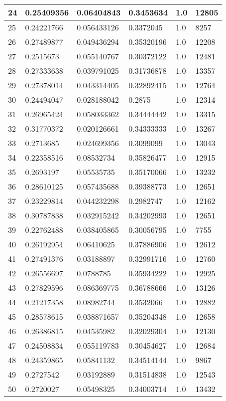 \begin{longtable}{|l|l|l|l|l|l|}
24 & 0.25409356 & 0.06404843 & 0.3453634 & 1.0 & 12805 \\ \hline 
25 & 0.24221766 & 0.056433126 & 0.3372045 & 1.0 & 8257 \\ \hline 
26 & 0.27489877 & 0.049436294 & 0.35320196 & 1.0 & 12208 \\ \hline 
27 & 0.2515673 & 0.055140767 & 0.30372122 & 1.0 & 12481 \\ \hline 
28 & 0.27333638 & 0.039791025 & 0.31736878 & 1.0 & 13357 \\ \hline 
29 & 0.27378014 & 0.043314405 & 0.32892415 & 1.0 & 12764 \\ \hline 
30 & 0.24494047 & 0.028188042 & 0.2875 & 1.0 & 12314 \\ \hline 
31 & 0.26965424 & 0.058033362 & 0.34444442 & 1.0 & 13315 \\ \hline 
32 & 0.31770372 & 0.020126661 & 0.34333333 & 1.0 & 13267 \\ \hline 
33 & 0.2713685 & 0.024699356 & 0.3099099 & 1.0 & 13043 \\ \hline 
34 & 0.22358516 & 0.08532734 & 0.35826477 & 1.0 & 12915 \\ \hline 
35 & 0.2693197 & 0.05535735 & 0.35170066 & 1.0 & 13232 \\ \hline 
36 & 0.28610125 & 0.057435688 & 0.39388773 & 1.0 & 12651 \\ \hline 
37 & 0.23229814 & 0.044232298 & 0.2982747 & 1.0 & 12162 \\ \hline 
38 & 0.30787838 & 0.032915242 & 0.34202993 & 1.0 & 12651 \\ \hline 
39 & 0.22762488 & 0.038405865 & 0.30056795 & 1.0 & 7755 \\ \hline 
40 & 0.26192954 & 0.06410625 & 0.37886906 & 1.0 & 12612 \\ \hline 
41 & 0.27491376 & 0.03188897 & 0.32991716 & 1.0 & 12760 \\ \hline 
42 & 0.26556697 & 0.0788785 & 0.35934222 & 1.0 & 12925 \\ \hline 
43 & 0.27829596 & 0.086369775 & 0.36788666 & 1.0 & 13126 \\ \hline 
44 & 0.21217358 & 0.08982744 & 0.3532066 & 1.0 & 12882 \\ \hline 
45 & 0.28578615 & 0.038871657 & 0.35204348 & 1.0 & 12658 \\ \hline 
46 & 0.26386815 & 0.04535982 & 0.32029304 & 1.0 & 12130 \\ \hline 
47 & 0.24508834 & 0.055119783 & 0.30454627 & 1.0 & 12684 \\ \hline 
48 & 0.24359865 & 0.05841132 & 0.34514144 & 1.0 & 9867 \\ \hline 
49 & 0.2727542 & 0.03192889 & 0.31514838 & 1.0 & 12543 \\ \hline 
50 & 0.2720027 & 0.05498325 & 0.34003714 & 1.0 & 13432 \\ \hline 
\end{longtable}